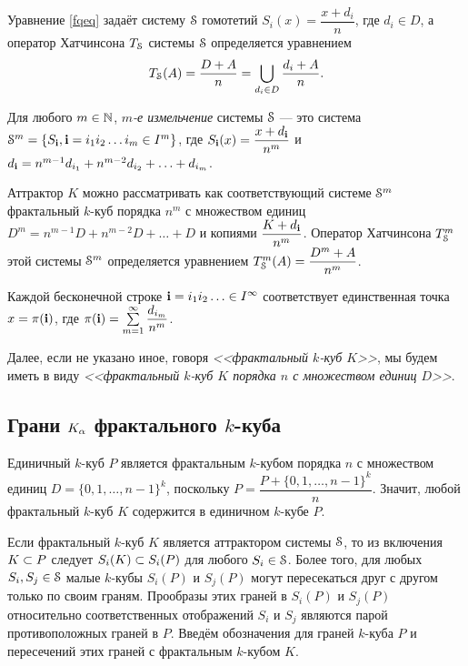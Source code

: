 Уравнение \eqref{fqeq} задаёт систему ${\EuScript S}$ гомотетий $S_i(x)=\dfrac{x+d_i}{n}$, где $d_i\in D$, а оператор Хатчинсона $T_{\EuScript S}$ системы ${\EuScript S}$ определяется уравнением $$T_{\EuScript S}(A)=\dfrac{D+A}{n}=\bigcup\limits_{d_i\in D}\dfrac{d_i+A}{n}.$$

\begin{definition}\label{refin}
Для любого $m\in \mathbb{N}$, {\em $m$-е измельчение} системы ${\EuScript S}$ --- это система ${\EuScript S}^m=\{S_{\bf{i}}, {\bf{i}}=i_1i_2\ldots i_m\in I^m\}$, где $S_{\bf{i}}(x)=\dfrac{x+d_{\bf{i}}}{n^m}$ и $d_{\bf{i}}=n^{m-1}d_{i_1}+n^{m-2}d_{i_2}+\ldots+d_{i_m}$. 
\end{definition}

Аттрактор $K$ можно рассматривать как соответствующий системе ${\EuScript S}^m$ фрактальный $k$-куб порядка $n^m$ с множеством единиц $D^m=n^{m-1}D+n^{m-2}D+\ldots+D$ и копиями $\dfrac{K+d_{\bf{i}}}{n^m}$.
Оператор Хатчинсона $T_{\EuScript S}^m$ этой системы ${\EuScript S}^m$ определяется уравнением $T_{\EuScript S}^m(A)=\dfrac{D^m+A}{n^m}$.

Каждой бесконечной строке ${\bf{i}}=i_1i_2\ldots\in I^\infty$ соответствует единственная точка $x=\pi({\bf{i}})$, где $\pi({\bf{i}})=\sum\limits_{m=1}^\infty \dfrac{d_{i_m}}{n^m}$.

\begin{remark}%
Далее, если не указано иное, говоря {\em <<фрактальный $k$-куб $K$>>}, мы будем иметь в виду {\em <<фрактальный $k$-куб $K$ порядка $n$ с множеством единиц $D$>>}. 
\end{remark}


\subsection{Грани $K_\alpha$ фрактального $k$-куба}

Единичный $k$-куб $P$ является фрактальным $k$-кубом порядка $n$ с множеством единиц $D=\{0,1,\ldots,n-1\}^k$, поскольку $P=\dfrac{P+\{0,1,\ldots,n-1\}^k}{n}.$
Значит, любой фрактальный $k$-куб $K$ содержится в единичном $k$-кубе $P$.

Если фрактальный $k$-куб $K$ является аттрактором системы ${\EuScript S}$, то из включения $K\subset P$ следует $S_i(K)\subset S_i(P)$ для любого $S_i\in{\EuScript S}$.
Более того, для любых $S_i, S_j\in{\EuScript S}$ малые $k$-кубы $S_i(P)$ и $S_j(P)$ могут пересекаться друг с другом только по своим граням.
Прообразы этих граней в $S_i(P)$ и $S_j(P)$ относительно соответственных отображений $S_i$ и $S_j$ являются парой противоположных граней в $P$.
Введём обозначения для граней $k$-куба $P$ и пересечений этих граней с фрактальным $k$-кубом $K$.

